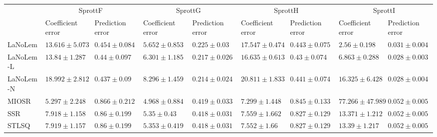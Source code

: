 \begin{table*}
{\begin{tabular}{lllllllll}
 & \multicolumn{2}{c}{SprottF} & \multicolumn{2}{c}{SprottG} & \multicolumn{2}{c}{SprottH} & \multicolumn{2}{c}{SprottI} \\
 & Coefficient error & Prediction error & Coefficient error & Prediction error & Coefficient error & Prediction error & Coefficient error & Prediction error \\
\midrule
LaNoLem & $13.616\pm 5.073$ & $0.454\pm 0.084$ & $5.652\pm 0.853$ & $0.225\pm 0.03$ & $17.547\pm 0.474$ & $0.443\pm 0.075$ & $\mathbf{2.56}\pm 0.198$ & $0.031\pm 0.004$ \\
LaNoLem-L & $13.84\pm 1.287$ & $0.44\pm 0.097$ & $6.301\pm 1.185$ & $0.217\pm 0.026$ & $16.635\pm 0.613$ & $\mathbf{0.43}\pm 0.074$ & $6.863\pm 0.288$ & $\mathbf{0.028}\pm 0.003$ \\
LaNoLem-N & $18.992\pm 2.812$ & $\mathbf{0.437}\pm 0.09$ & $8.296\pm 1.459$ & $\mathbf{0.214}\pm 0.024$ & $20.811\pm 1.833$ & $0.441\pm 0.074$ & $16.325\pm 6.428$ & $0.028\pm 0.004$ \\
MIOSR & $\mathbf{5.297}\pm 2.248$ & $0.866\pm 0.212$ & $\mathbf{4.968}\pm 0.884$ & $0.419\pm 0.033$ & $\mathbf{7.299}\pm 1.448$ & $0.845\pm 0.133$ & $77.266\pm 47.989$ & $0.052\pm 0.005$ \\
SSR & $7.918\pm 1.158$ & $0.86\pm 0.199$ & $5.35\pm 0.43$ & $0.418\pm 0.031$ & $7.559\pm 1.662$ & $0.827\pm 0.129$ & $13.371\pm 1.212$ & $0.052\pm 0.005$ \\
STLSQ & $7.919\pm 1.157$ & $0.86\pm 0.199$ & $5.353\pm 0.419$ & $0.418\pm 0.031$ & $7.552\pm 1.66$ & $0.827\pm 0.129$ & $13.39\pm 1.217$ & $0.052\pm 0.005$ \\

\midrule


\end{tabular}}
\end{table*}
